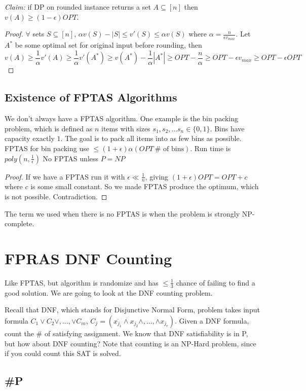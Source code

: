 \documentclass[11pt]{article}
\newcommand{\sse}{\subseteq}
\newcommand{\ep}{\epsilon}
\begin{document}
{\it Claim:} if DP on rounded instance returns a set $A \subseteq [n]$ then $v(A)\ge (1- \ep) OPT$.
\begin{proof}
$\forall$ sets $S\sse [n]$, $\alpha v(S) - |S|\le v'(S) \le \alpha v(S)$ where $\alpha = \frac{n}{\ep v_{max}}$. Let $A^*$ be some optimal set for original input before rounding, then
$$v(A) \ge \frac{1}{\alpha}v'(A) \ge \frac{1}{\alpha}v'(A^*) \ge v(A^*) - \frac{1}{\alpha}|A^*| \ge OPT - \frac{n}{\alpha} \ge OPT - \ep v_{max}\ge OPT - \ep OPT$$
\end{proof}

\subsection{Existence of FPTAS Algorithms}
We don't always have a FPTAS algorithm. One example is the bin packing problem, which is defined as $n$ items with sizes $s_1, s_2,... s_n\in \{0,1\}$. Bins have capacity exactly $1$. The goal is to pack all items into as few bins as possible. FPTAS for bin packing use $\le (1+\ep) \alpha (OPT ~ \#\text{ of bins})$. Run time is $poly (n,\frac{1}{\ep})$ No FPTAS unless $P=NP$
\begin{proof}
If we have a FPTAS run it with $\ep \ll \frac{1}{n}$, giving $(1 + \ep)OPT=OPT+c$ where $c$ is some small constant. So we made FPTAS produce the optimum, which is not possible. Contradiction.
\end{proof}
The term we used when there is no FPTAS is when the problem is strongly NP-complete.


\section{FPRAS DNF Counting}
Like FPTAS, but algorithm is randomize and has $\le \frac{1}{3}$ chance of failing to find a good solution. We are going to look at the DNF counting problem.

Recall that DNF, which stands for Disjunctive Normal Form, problem takes input formula $C_1 \vee C_2 \vee, ..., \vee C_m$, $C_j=(\overline{x_{j_1}} \wedge x_{j_2} \wedge,...,\wedge x_{j_r})$. Given a DNF formula, count the \# of satisfying assignment. We know that DNF satisfiability is in P, but how about DNF counting? Note that counting is an NP-Hard problem, since if you could count this SAT is solved. 

\subsection{\#P}
\end{document}
